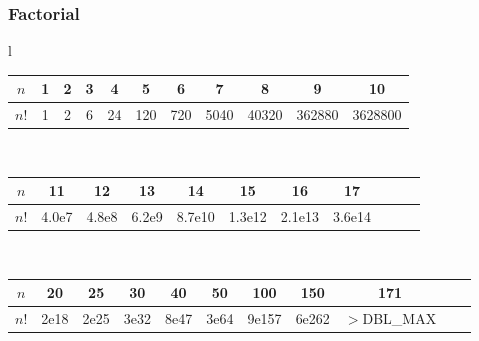 \subsubsection{Factorial}
\begin{center}
\begin{tabular}{l}
  \begin{tabular}{c|c@{\ }c@{\ }c@{\ }c@{\ }c@{\ }c@{\ }c@{\ }c@{\ }c@{\ }c}
    $n$  & 1 & 2 & 3 & 4  & 5   & 6   & 7    & 8     & 9      & 10\\
    \hline
    $n!$ & 1 & 2 & 6 & 24 & 120 & 720 & 5040 & 40320 & 362880 & 3628800\\
  \end{tabular}\\
  \begin{tabular}{c|c@{\ }c@{\ }c@{\ }c@{\ }c@{\ }c@{\ }c@{\ }c@{\ }c@{\ }c}
    $n$  & 11    & 12    & 13    & 14     & 15     & 16     & 17\\
    \hline
    $n!$ & 4.0e7 & 4.8e8 & 6.2e9 & 8.7e10 & 1.3e12 & 2.1e13 & 3.6e14\\
  \end{tabular}\\
  \begin{tabular}{c|c@{\ }c@{\ }c@{\ }c@{\ }c@{\ }c@{\ }c@{\ }c@{\ }c@{\ }c}
    $n$  & 20   & 25   & 30   & 40   & 50   & 100   & 150   & 171\\
    \hline
    $n!$ & 2e18 & 2e25 & 3e32 & 8e47 & 3e64 & 9e157 & 6e262 & \scriptsize{$>$DBL\_MAX}\\
  \end{tabular}
\end{tabular}
\end{center}


